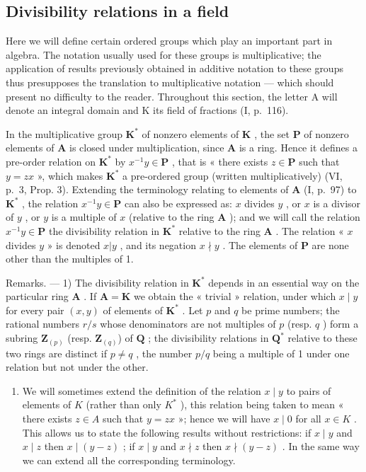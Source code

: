 \subsection{Divisibility relations in a field}

Here we will define certain ordered groups which play an important part in algebra. The notation usually used for these groups is multiplicative; the application of results previously obtained in additive notation to these groups thus presupposes the translation to multiplicative notation --- which should present no difficulty to the reader. Throughout this section, the letter A will denote an integral domain and K its field of fractions (I, p.~116).

In the multiplicative group \(\mathbf{K}^*\) of nonzero elements of \(\mathbf{K}\) , the set \(\mathbf{P}\) of nonzero elements of \(\mathbf{A}\) is closed under multiplication, since \(\mathbf{A}\) is a ring. Hence it defines a pre-order relation on \(\mathbf{K}^*\) by \(x^{-1}y\in \mathbf{P}\) , that is « there exists \(z\in \mathbf{P}\) such that \(y = zx\) », which makes \(\mathbf{K}^*\) a pre-ordered group (written multiplicatively) (VI, p.~3, Prop. 3). Extending the terminology relating to elements of \(\mathbf{A}\) (I, p.~97) to \(\mathbf{K}^*\) , the relation \(x^{-1}y\in \mathbf{P}\) can also be expressed as: \(x\) divides \(y\) , or \(x\) is a divisor of \(y\) , or \(y\) is a multiple of \(x\) (relative to the ring \(\mathbf{A}\) ); and we will call the relation \(x^{-1}y\in \mathbf{P}\) the divisibility relation in \(\mathbf{K}^*\) relative to the ring \(\mathbf{A}\) . The relation « \(x\) divides \(y\) » is denoted \(x|y\) , and its negation \(x\nmid y\) . The elements of \(\mathbf{P}\) are none other than the multiples of 1.

Remarks. --- 1) The divisibility relation in \(\mathbf{K}^*\) depends in an essential way on the particular ring \(\mathbf{A}\) . If \(\mathbf{A} = \mathbf{K}\) we obtain the « trivial » relation, under which \(x \mid y\) for every pair \((x, y)\) of elements of \(\mathbf{K}^*\) . Let \(p\) and \(q\) be prime numbers; the rational numbers \(r/s\) whose denominators are not multiples of \(p\) (resp. \(q\) ) form a subring \(\mathbf{Z}_{(p)}\) (resp. \(\mathbf{Z}_{(q)}\)) of \(\mathbf{Q}\) ; the divisibility relations in \(\mathbf{Q}^*\) relative to these two rings are distinct if \(p \neq q\) , the number \(p/q\) being a multiple of 1 under one relation but not under the other.

\begin{enumerate}
\def\labelenumi{\arabic{enumi})}
\setcounter{enumi}{1}
\tightlist
\item
  We will sometimes extend the definition of the relation \(x \mid y\) to pairs of elements of \(K\) (rather than only \(K^*\) ), this relation being taken to mean « there exists \(z \in A\) such that \(y = zx\) »; hence we will have \(x \mid 0\) for all \(x \in K\) . This allows us to state the following results without restrictions: if \(x \mid y\) and \(x \mid z\) then \(x \mid (y - z)\) ; if \(x \mid y\) and \(x \nmid z\) then \(x \nmid (y - z)\) . In the same way we can extend all the corresponding terminology.
\end{enumerate}

